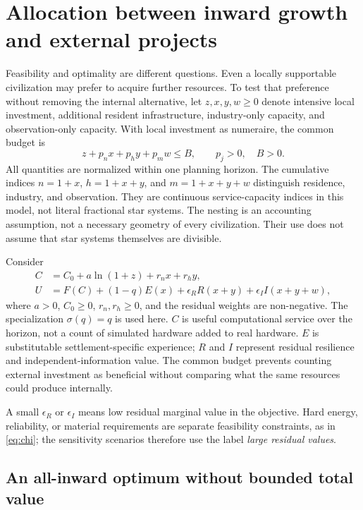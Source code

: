 \section{Allocation between inward growth and external projects}
\label{sec:allocation}

Feasibility and optimality are different questions. Even a locally supportable civilization may prefer to acquire further resources. To test that preference without removing the internal alternative, let $z,x,y,w\geq0$ denote intensive local investment, additional resident infrastructure, industry-only capacity, and observation-only capacity. With local investment as numeraire, the common budget is
\begin{equation}
 z+p_nx+p_hy+p_mw\leq B,\qquad p_j>0,\quad B>0.
 \label{eq:budget}
\end{equation}
All quantities are normalized within one planning horizon. The cumulative indices $n=1+x$, $h=1+x+y$, and $m=1+x+y+w$ distinguish residence, industry, and observation. They are continuous service-capacity indices in this model, not literal fractional star systems. The nesting is an accounting assumption, not a necessary geometry of every civilization. Their use does not assume that star systems themselves are divisible.

Consider
\begin{align}
 C&=C_0+a\ln(1+z)+r_nx+r_hy,\label{eq:compute}\\
 U&=F(C)+(1-q)E(x)+\epsilon_RR(x+y)+\epsilon_II(x+y+w),\label{eq:utility}
\end{align}
where $a>0$, $C_0\geq0$, $r_n,r_h\geq0$, and the residual weights are non-negative. The specialization $\sigma(q)=q$ is used here. $C$ is useful computational service over the horizon, not a count of simulated hardware added to real hardware. $E$ is substitutable settlement-specific experience; $R$ and $I$ represent residual resilience and independent-information value. The common budget prevents counting external investment as beneficial without comparing what the same resources could produce internally.

A small $\epsilon_R$ or $\epsilon_I$ means low residual marginal value in the objective. Hard energy, reliability, or material requirements are separate feasibility constraints, as in \cref{eq:chi}; the sensitivity scenarios therefore use the label \emph{large residual values}.

\subsection{An all-inward optimum without bounded total value}

